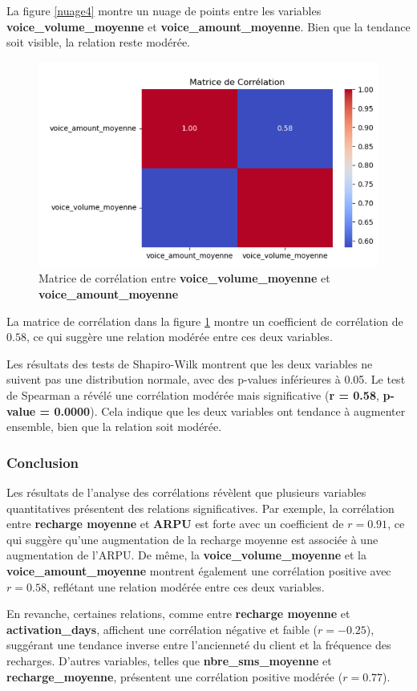 \noindent
La figure \ref{nuage4} montre un nuage de points entre les variables \textbf{voice\_volume\_moyenne} et \textbf{voice\_amount\_moyenne}. Bien que la tendance soit visible, la relation reste modérée.

\begin{figure}[H]
    \centering
    \includegraphics[width=0.5\linewidth]{capture_sas_51.png}
    \caption{Matrice de corrélation entre \textbf{voice\_volume\_moyenne} et \textbf{voice\_amount\_moyenne}}
    \label{matrice4}
\end{figure}

\noindent
La matrice de corrélation dans la figure \ref{matrice4} montre un coefficient de corrélation de \(0.58\), ce qui suggère une relation modérée entre ces deux variables.

\noindent
Les résultats des tests de Shapiro-Wilk montrent que les deux variables ne suivent pas une distribution normale, avec des p-values inférieures à 0.05. Le test de Spearman a révélé une corrélation modérée mais significative (\textbf{r = 0.58}, \textbf{p-value = 0.0000}). Cela indique que les deux variables ont tendance à augmenter ensemble, bien que la relation soit modérée.

\subsubsection*{Conclusion }

Les résultats de l'analyse des corrélations révèlent que plusieurs variables quantitatives présentent des relations significatives. Par exemple, la corrélation entre \textbf{recharge moyenne} et \textbf{ARPU} est forte avec un coefficient de \(r = 0.91\), ce qui suggère qu'une augmentation de la recharge moyenne est associée à une augmentation de l'ARPU. De même, la \textbf{voice\_volume\_moyenne} et la \textbf{voice\_amount\_moyenne} montrent également une corrélation positive avec \(r = 0.58\), reflétant une relation modérée entre ces deux variables.

En revanche, certaines relations, comme entre \textbf{recharge moyenne} et \textbf{activation\_days}, affichent une corrélation négative et faible (\(r = -0.25\)), suggérant une tendance inverse entre l'ancienneté du client et la fréquence des recharges. D'autres variables, telles que \textbf{nbre\_sms\_moyenne} et \textbf{recharge\_moyenne}, présentent une corrélation positive modérée (\(r = 0.77\)).

